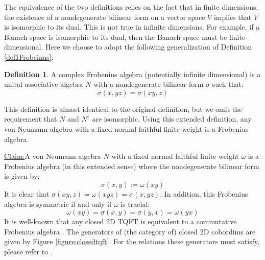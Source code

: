 \documentclass[a4paper,11pt]{article}
\theoremstyle{definition}
\newtheorem{definition}{Definition}[section]
\numberwithin{equation}{section}
\newenvironment{claim}[1]{\par\noindent\underline{Claim:}\space#1}{}
\begin{document}
The equivalence of the two definitions relies on the fact that in finite dimensions, the existence of a nondegenerate bilinear form on a vector space $V$ implies that $V$ is isomorphic to its dual. This is not true in infinite dimensions. For example, if a Banach space is isomorphic to its dual, then the Banach space must be finite-dimensional. Here we choose to adopt the following generalization of Definition \ref{def1Frobeinus}:
\begin{definition}
    A complex Frobenius algebra (potentially infinite dimensional) is a unital associative algebra $N$ with a nondegenerate bilinear form $\sigma$ such that:
    \begin{equation}
        \sigma(x,yz) = \sigma(xy, z)
    \end{equation}
\end{definition}
This definition is almost identical to the original definition, but we omit the requirement that $N$ and $N^\dagger$ are isomorphic. Using this extended definition, any von Neumann algebra with a fixed normal faithful finite weight is a Frobenius algebra.

\begin{claim}
    A von Neumann algebra $N$ with a fixed normal faithful finite weight $\omega$ is a Frobenius algebra (in this extended sense) where the nondegenerate bilinear form is given by:
    \begin{equation}
        \sigma(x,y) := \omega(xy)
    \end{equation}
    It is clear that $\sigma(xy,z) = \omega(xyz) = \sigma(x,yz)$. In addition, this Frobenius algebra is symmetric if and only if $\omega$ is tracial:
    \begin{equation}
        \omega(xy) = \sigma(x,y) = \sigma(y,x) = \omega(yx)
    \end{equation}
\end{claim}
It is well-known that any closed 2D TQFT is equivalent to a commutative Frobenius algebra \cite{abrams1996two, frobeniusTQFT2}. The generators of (the category of) closed 2D cobordims are given by Figure \ref{figure:closedtqft}. For the relations these generators must satisfy, please refer to \cite{abrams1996two, frobeniusTQFT2}.
\end{document}
